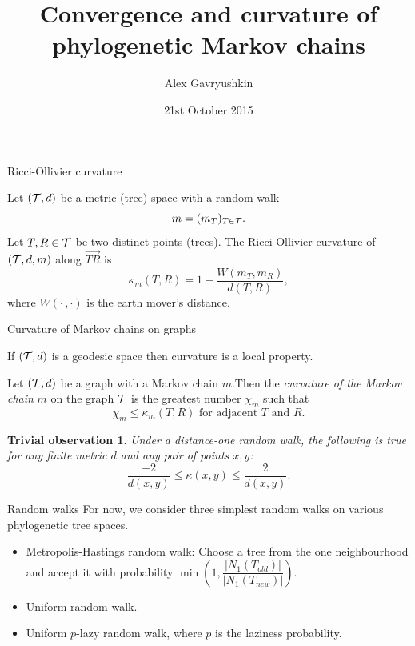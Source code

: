 \documentclass{beamer}
\title[AWC Meeting: {\em Phylogenetic Markov chains}]{Convergence and curvature of phylogenetic Markov chains}
\author{Alex Gavryushkin}
\date{21st October 2015}
\newtheorem{oobservation}{Trivial observation}
\begin{document}
\begin{frame}[plain]
\titlepage
\end{frame}

\begin{frame}{Ricci-Ollivier curvature}
\begin{definition}[Ollivier~{[2009]}]
Let $({\cal T},d)$ be a metric (tree) space with a random walk
\vskip-3mm
\[
m = (m_T)_{T\in{\cal T}}.
\]
Let $T,R \in {\cal T}$ be two distinct points (trees).
The Ricci-Ollivier curvature of $({\cal T},d,m)$ along $\overrightarrow{TR}$ is
\vskip-3mm
\[
\kappa_m(T,R) = 1 - \frac{W(m_T ,m_R)}{d(T,R)},
\]
where $W(\cdot\,,\cdot)$ is the earth mover's distance.
\end{definition}
\end{frame}

\begin{frame}{Curvature of Markov chains on graphs}

\begin{theorem}[Ollivier~{[2009]}]
If $({\cal T}, d)$ is a geodesic space then curvature is a local property.
\end{theorem}

\begin{definition}
Let $({\cal T}, d)$ be a graph with a Markov chain $m$.Then the {\em curvature of the Markov chain} $m$ on the graph $\cal T$ is the greatest number $\chi_m$ such that
\vskip-5mm
\[
\chi_m \leq \kappa_m(T,R) \mbox{ for adjacent $T$ and $R$}.
\]
\end{definition}

\begin{oobservation}
Under a distance-one random walk, the following is true for any finite metric $d$ and any pair of points $x,y$:
\vskip-3mm
\[
\dfrac{-2}{d(x,y)} \leq \kappa(x,y) \leq \dfrac{2}{d(x,y)}.
\]
\end{oobservation}
\end{frame}

\begin{frame}{Random walks}
For now, we consider three simplest random walks on various phylogenetic tree spaces.

\begin{itemize}
\item Metropolis-Hastings random walk: Choose a tree from the one neighbourhood and accept it with probability $\min(1, \dfrac{|N_1(T_{old})|}{|N_1(T_{new})|})$.
\item Uniform random walk.
\item Uniform $p$-lazy random walk, where $p$ is the laziness probability.
\end{itemize}
\end{frame}
\end{document}
